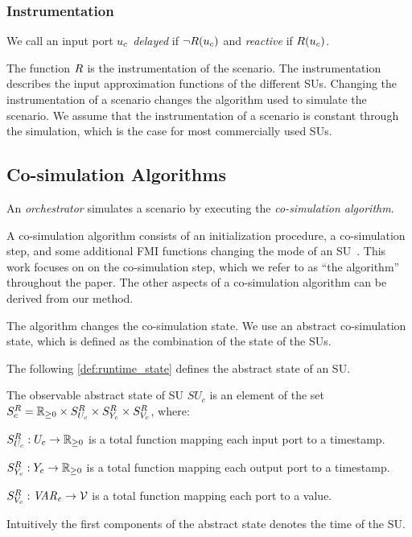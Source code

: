 \subsubsection{Instrumentation}
We call an input port $u_{c}$ \emph{delayed} if $\neg R(u_{c})$ and \emph{reactive} if $R(u_{c})$. 

The function $R$ is the instrumentation of the scenario.
The instrumentation describes the input approximation functions of the different SUs.
Changing the instrumentation of a scenario changes the algorithm used to simulate the scenario.
We assume that the instrumentation of a scenario is constant through the simulation, which is the case for most commercially used SUs.

\subsection{Co-simulation Algorithms}\label{sc:cosimalgo}
An \emph{orchestrator} simulates a scenario by executing the \emph{co-simulation algorithm}.

A co-simulation algorithm consists of an initialization procedure, a co-simulation step, and some additional FMI functions changing the mode of an SU~\cite{FMI2014}.
This work focuses on on the co-simulation step, which we refer to as ``the algorithm'' throughout the paper. 
The other aspects of a co-simulation algorithm can be derived from our method.  

The algorithm changes the co-simulation state. 
We use an abstract co-simulation state, which is defined as the combination of the state of the SUs.

The following \cref{def:runtime_state} defines the abstract state of an SU.

\begin{definition}\label{def:runtime_state}
  The observable abstract state of SU $SU_c$ is an element of the set $S^{R}_{c} = \mathbb{R}_{\geq 0} \times S^{R}_{U_{c}} \times S^{R}_{Y_{c}} \times S^{R}_{V_c}$, where:
  \begin{compactitem}
    \item $S^{R}_{U_{c}} : U_{c} \to \mathbb{R}_{\geq 0}$ is a total function mapping each input port to a timestamp.  
    \item $S^{R}_{Y_{c}} : Y_{c} \to \mathbb{R}_{\geq 0}$ is a total function mapping each output port to a timestamp.  
    \item $S^{R}_{V_c} : \mathit{VAR_{c}} \to \mathcal{V}$ is a total function mapping each port to a value.  
  \end{compactitem}
  Intuitively the first components of the abstract state denotes the time of the SU.
\end{definition}


